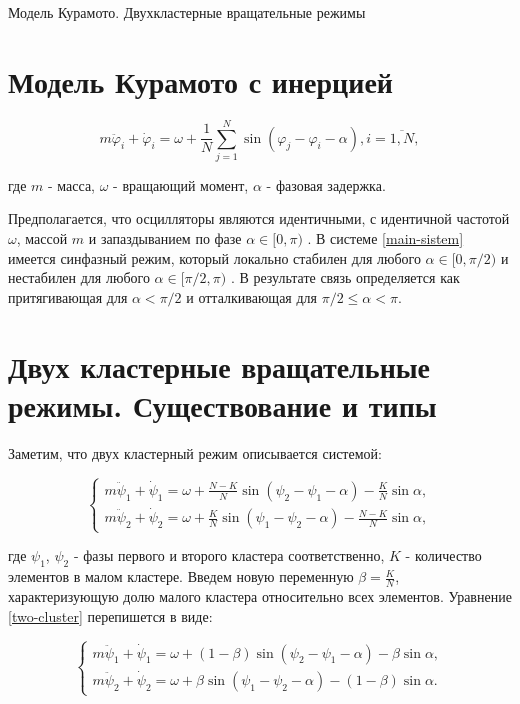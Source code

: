 \begin{chapter}{Модель Курамото. Двухкластерные вращательные режимы}
	\section{Модель Курамото с инерцией}

	\begin{equation} \label{main-sistem}
		m\ddot{\varphi}_i + \dot{\varphi}_i = \omega + 
		\frac{1}{N} \sum_{j = 1}^N \sin{(\varphi_j - 
		\varphi_i - \alpha)}, i = \overline{1, N}, 
	\end{equation}
	
	где $m$ - масса, $\omega$ - вращающий момент,
	$\alpha$ - фазовая задержка.
	
	Предполагается, что осцилляторы являются идентичными, с идентичной частотой $\omega$, массой $m$ и запаздыванием по
	фазе $\alpha \in [0, \pi)$ \cite{Sakaguchi} . В системе \ref{main-sistem} имеется синфазный режим, который локально стабилен для любого $\alpha \in [0, \pi/2)$
	и нестабилен для любого $\alpha \in [\pi/2, \pi)$ \cite{Acebron:Bonilla}. В результате связь определяется как
	притягивающая для $\alpha < \pi/2$ и отталкивающая для $\pi/2 \leq \alpha < \pi$.

	\section{Двух кластерные вращательные режимы. Существование и типы}
	
	Заметим, что двух кластерный режим описывается системой:
	
	\begin{equation} \label{two-cluster}
		\begin{cases}
			m\ddot{\psi}_1 + \dot{\psi}_1 = \omega + \frac{N-K}{N} \sin{(\psi_2 - \psi_1 - \alpha)} - \frac{K}{N}\sin{\alpha},\\
			m\ddot{\psi}_2 + \dot{\psi}_2 = \omega + \frac{K}{N} \sin{(\psi_1 - \psi_2 - \alpha)} - \frac{N - K}{N}\sin{\alpha},
		\end{cases}
	\end{equation}
	
	где $\psi_1$, $\psi_2$ - фазы первого и
	второго кластера соответственно, $K$ - количество элементов в малом кластере.
	Введем новую переменную $\beta = \frac{K}{N}$, характеризующую долю малого кластера относительно всех элементов. 
	Уравнение \ref{two-cluster} перепишется в виде:
	
	\begin{equation} \label{two-cluster-beta}
		\begin{cases}
			m\ddot{\psi}_1 + \dot{\psi}_1 = \omega + (1 - \beta) \sin{(\psi_2 - \psi_1 - \alpha)} - \beta\sin{\alpha}, \\
			m\ddot{\psi}_2 + \dot{\psi}_2 = \omega + \beta \sin{(\psi_1 - \psi_2 - \alpha)} - (1 - \beta)\sin{\alpha}.
		\end{cases}
	\end{equation}
	

\end{chapter}

